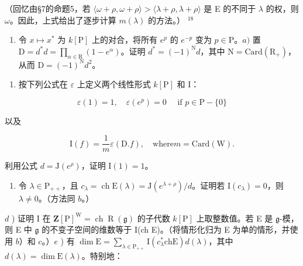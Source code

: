 （回忆由§7的命题5，若 \(\langle\omega+\rho,\omega+\rho\rangle>\langle\lambda+\rho,\lambda+\rho\rangle\) 是 E 的不同于 \(\lambda\) 的权，则 \(\omega\)。因此，上式给出了逐步计算 \(m(\lambda)\) 的方法。） \(^{18}\)

\begin{enumerate}
\def\labelenumi{\arabic{enumi})}
\setcounter{enumi}{5}
\tightlist
\item
  令 \(x \mapsto x^*\) 为 \(k[\mathrm{P}]\) 上的对合，将所有 \(e^p\) 的 \(e^{-p}\) 变为 \(p \in \mathrm{P}\)。\(a)\) 置 \(\mathrm{D} = d^* d = \prod_{\alpha \in \mathrm{R}} (1 - e^\alpha)\)。证明 \(d^* = (-1)^{\mathrm{N}} d\)，其中 \(\mathrm{N} = \mathrm{Card}(\mathrm{R}_+)\)，从而 \(\mathrm{D} = (-1)^{\mathrm{N}} d^2\)。
\end{enumerate}

\begin{enumerate}
\def\labelenumi{\alph{enumi})}
\setcounter{enumi}{1}
\tightlist
\item
  按下列公式在 \(\varepsilon\) 上定义两个线性形式 \(k[\mathrm{P}]\) 和 I：
\end{enumerate}

\[
\varepsilon (1) = 1, \quad \varepsilon (e ^ {p}) = 0 \quad \text { if } p \in \mathrm{P} - \{0 \}
\]

以及

\[
\mathrm{I} (f) = \frac {1}{m} \varepsilon (\mathrm{D}. f), \quad \mathrm{where} m = \mathrm{Card} (\mathrm{W}).
\]

利用公式 \(d = \mathrm{J}(e^{\rho})\)，证明 \(\mathrm{I}(1) = 1\)。

\begin{enumerate}
\def\labelenumi{\alph{enumi})}
\setcounter{enumi}{2}
\tightlist
\item
  令 \(\lambda \in \mathrm{P}_{++}\)，且 \(c_{\lambda} = \operatorname{ch} \mathrm{E}(\lambda) = \mathrm{J}(e^{\lambda + \rho}) / d\)。证明若 \(\mathrm{I}(c_{\lambda}) = 0\)，则 \(\lambda \neq 0\)。（方法同 \(b\)。）
\end{enumerate}

\(d\) ) 证明 I 在 \(\mathbf{Z}[\mathrm{P}]^{\mathrm{W}} = \operatorname {ch}\operatorname {R}(\mathfrak{g})\) 的子代数 \(k[\mathrm{P}]\) 上取整数值。若 E 是 \(\mathfrak{g}\)-模，则 E 中 \(\mathfrak{g}\) 的不变子空间的维数等于 I(ch E)。（将情形化归为 E 为单的情形，并使用 \(b\)）和 \(c\)。）\(e\) ) 有 \(\dim \mathrm{E} = \sum_{\lambda \in \mathrm{P}_{++}}\mathrm{I}(c_\lambda^*\mathrm{ch}\mathrm{E})d(\lambda)\)，其中 \(d(\lambda) = \dim \mathrm{E}(\lambda)\)。特别地：

